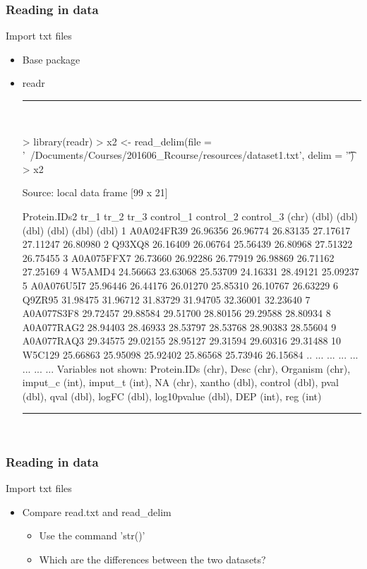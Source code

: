\documentclass{beamer}
\begin{document}
\begin{frame}[fragile]
	\frametitle{Reading in data}
	\centering \Large Import txt files
	\begin{itemize}
		\small
		\item Base package
		\item readr
\rule{\textwidth}{0.4pt}\\
\tiny
\setlength{\fancyvrbtopsep}{-1pt}
\setlength{\fancyvrbpartopsep}{-1pt}
\begin{Schunk}
\begin{Sinput}
> library(readr)
> x2 <- read_delim(file = '~/Documents/Courses/201606_Rcourse/resources/dataset1.txt', delim = '\t')
> x2
\end{Sinput}
\begin{Soutput}
Source: local data frame [99 x 21]

   Protein.IDs2     tr_1     tr_2     tr_3 control_1 control_2 control_3
          (chr)    (dbl)    (dbl)    (dbl)     (dbl)     (dbl)     (dbl)
1    A0A024FR39 26.96356 26.96774 26.83135  27.17617  27.11247  26.80980
2        Q93XQ8 26.16409 26.06764 25.56439  26.80968  27.51322  26.75455
3    A0A075FFX7 26.73660 26.92286 26.77919  26.98869  26.71162  27.25169
4        W5AMD4 24.56663 23.63068 25.53709  24.16331  28.49121  25.09237
5    A0A076U5I7 25.96446 26.44176 26.01270  25.85310  26.10767  26.63229
6        Q9ZR95 31.98475 31.96712 31.83729  31.94705  32.36001  32.23640
7    A0A077S3F8 29.72457 29.88584 29.51700  28.80156  29.29588  28.80934
8    A0A077RAG2 28.94403 28.46933 28.53797  28.53768  28.90383  28.55604
9    A0A077RAQ3 29.34575 29.02155 28.95127  29.31594  29.60316  29.31488
10       W5C129 25.66863 25.95098 25.92402  25.86568  25.73946  26.15684
..          ...      ...      ...      ...       ...       ...       ...
Variables not shown: Protein.IDs (chr), Desc (chr), Organism (chr), imput_c
  (int), imput_t (int), NA (chr), xantho (dbl), control (dbl), pval (dbl), qval
  (dbl), logFC (dbl), log10pvalue (dbl), DEP (int), reg (int)
\end{Soutput}
\end{Schunk}
\rule{\textwidth}{0.4pt}\\
\small
	
	\end{itemize}
\end{frame}


\begin{frame}[fragile]
	\frametitle{Reading in data}
	\centering \Large Import txt files
	\begin{itemize}
		\small
		\item Compare read.txt and read\_delim
			\begin{itemize}
				\item Use the command 'str()'
				\item Which are the differences between the two datasets?
			\end{itemize}
\small
	
	\end{itemize}
\end{frame}
\end{document}
